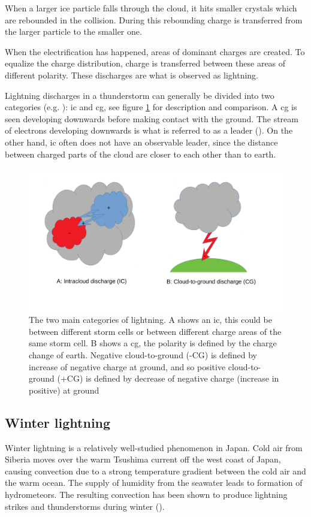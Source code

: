 When a larger ice particle falls through the cloud, it hits smaller crystals which are rebounded in the collision. During this rebounding charge is transferred from the larger particle to the smaller one. 

When the electrification has happened, areas of dominant charges are created. To equalize the charge distribution, charge is transferred between these areas of different polarity. These discharges are what is observed as lightning. 

Lightning discharges in a thunderstorm can generally be divided into two categories (e.g. \cite{lynn2011}): \acrfull{ic} and \acrfull{cg}, see figure \ref{fig:lyntyper} for description and comparison. A \acrshort{cg} is seen developing downwards before making contact with the ground. The stream of electrons developing downwards is what is referred to as a leader (\cite{rakovBok}). On the other hand, \acrshort{ic} often does not have an observable leader, since the distance between charged parts of the cloud are closer to each other than to earth.

\begin{figure}
    \centering
    \includegraphics[width=\textwidth]{Figures/lyntyper.pdf}
    \caption{The two main categories of lightning. A shows an \acrfull{ic}, this could be between different storm cells or between different charge areas of the same storm cell. B shows a \acrfull{cg}, the polarity is defined by the charge change of earth. Negative cloud-to-ground (-CG) is defined by increase of negative charge at ground, and so positive cloud-to-ground (+CG) is defined by decrease of negative charge (increase in positive) at ground}
    \label{fig:lyntyper}
\end{figure}


\subsection{Winter lightning}
Winter lightning is a relatively well-studied phenomenon in Japan. Cold air from Siberia moves over the warm Tsushima current off the west coast of Japan, causing convection due to a strong temperature gradient between the cold air and the warm ocean. The supply of humidity from the seawater leads to formation of hydrometeors. The resulting convection has been shown to produce lightning strikes and thunderstorms during winter (\cite{michimoto2007}).

